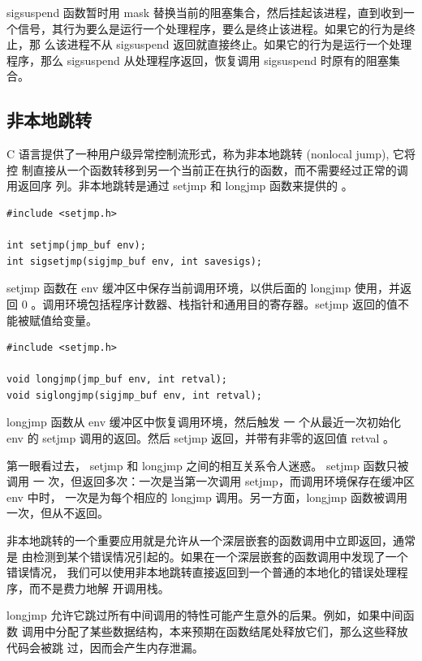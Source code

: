 sigsuspend 函数暂时用 mask 替换当前的阻塞集合，然后挂起该进程，直到收到一
个信号，其行为要么是运行一个处理程序，要么是终止该进程。如果它的行为是终止，那
么该进程不从 sigsuspend 返回就直接终止。如果它的行为是运行一个处理程序，那么
sigsuspend 从处理程序返回，恢复调用 sigsuspend 时原有的阻塞集合。

\subsection{非本地跳转}

C 语言提供了一种用户级异常控制流形式，称为非本地跳转 (nonlocal jump), 它将控
制直接从一个函数转移到另一个当前正在执行的函数，而不需要经过正常的调用返回序
列。非本地跳转是通过 setjmp 和 longjmp 函数来提供的 。
\begin{lstlisting}[style=CStyle]
#include <setjmp.h>

int setjmp(jmp_buf env);
int sigsetjmp(sigjmp_buf env, int savesigs);
\end{lstlisting}

setjmp 函数在 env 缓冲区中保存当前调用环境，以供后面的 longjmp 使用，并返回
0 。调用环境包括程序计数器、栈指针和通用目的寄存器。setjmp 返回的值不能被赋值给变量。

\begin{lstlisting}[style=CStyle]
#include <setjmp.h>

void longjmp(jmp_buf env, int retval);
void siglongjmp(sigjmp_buf env, int retval);
\end{lstlisting}

longjmp 函数从 env 缓冲区中恢复调用环境，然后触发 一 个从最近一次初始化 env
的 setjmp 调用的返回。然后 setjmp 返回，并带有非零的返回值 retval 。

第一眼看过去， setjmp 和 longjmp 之间的相互关系令人迷惑。
setjmp 函数只被调用 一 次，但返回多次：一次是当第一次调用 setjmp，而调用环境保存在缓冲区 env 中时，
一次是为每个相应的 longjmp 调用。另一方面，longjmp 函数被调用一次，但从不返回。

非本地跳转的一个重要应用就是允许从一个深层嵌套的函数调用中立即返回，通常是
由检测到某个错误情况引起的。如果在一个深层嵌套的函数调用中发现了一个错误情况，
我们可以使用非本地跳转直接返回到一个普通的本地化的错误处理程序，而不是费力地解
开调用栈。

longjmp 允许它跳过所有中间调用的特性可能产生意外的后果。例如，如果中间函数
调用中分配了某些数据结构，本来预期在函数结尾处释放它们，那么这些释放代码会被跳
过，因而会产生内存泄漏。


